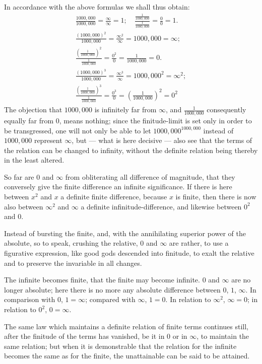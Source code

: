 \documentclass[12pt]{book}
\begin{document}
In accordance with the above formulas we shall thus obtain:
\begin{gather*}
\frac{1000{,}000}{1000{,}000} = \frac{\infty}{\infty} = 1; \quad
\frac{\frac{1}{1000{,}000}}{\frac{1}{1000{,}000}} = \frac{0}{0} = 1.\\
\frac{(1000{,}000)^{2}}{1000{,}000} = \frac{\infty^{2}}{\infty}
= 1000{,}000 = \infty;\\
\frac{\left(\frac{1}{1000{,}000}\right)^{2}}{\frac{1}{1000{,}000}}
= \frac{0^{2}}{0} = \frac{1}{1000{,}000} = 0.\\
\frac{(1000{,}000)^{3}}{1000{,}000} = \frac{\infty^{3}}{\infty}
= 1000{,}000^{2} = \infty^{2};\\
\frac{\left(\frac{1}{1000{,}000}\right)^{3}}{\frac{1}{1000{,}000}}
= \frac{0^{3}}{0} = \left(\frac{1}{1000{,}000}\right)^{2} = 0^{2}
\end{gather*}
The objection that $1000{,}000$ is infinitely far from $\infty$, and
$\frac{1}{1000{,}000}$ consequently equally far from $0$, means nothing; since the
finitude-limit is set only in order to be transgressed, one will not only be able to
let $1000{,}000^{1000{,}000}$ instead of $1000{,}000$ represent $\infty$,
but --- what is here decisive --- also see that the terms of the relation can be
changed to infinity, without the definite relation being thereby in the least
altered.

So far are $0$ and $\infty$ from obliterating all difference of magnitude, that they
conversely give the finite difference an infinite significance. If there is here
between $x^{2}$ and $x$ a definite finite difference, because $x$ is finite, then
there is now also between
$\infty^{2}$ and $\infty$ a definite infinitude-difference, and likewise between
$0^{2}$ and $0$.

Instead of bursting the finite, and, with the annihilating superior power of the
absolute, so to speak, crushing the relative, $0$ and $\infty$ are rather, to use a
figurative expression, like good gods descended into finitude, to exalt the relative
and to preserve the invariable in all changes.

The infinite becomes finite, that the finite may become infinite. $0$ and $\infty$
are no longer absolute; here there is no more any absolute difference between $0$,
$1$, $\infty$. In comparison with $0$, $1 = \infty$; compared with $\infty$,
$1 = 0$. In relation to $\infty^{2}$, $\infty = 0$; in relation to $0^{2}$,
$0 = \infty$.

The same law which maintains a definite relation of finite terms continues still,
after the finitude of the terms has vanished, be it in $0$ or in $\infty$, to
maintain the same relation; but when it is demonstrable that the relation for the
infinite becomes the same as for the finite, the unattainable can be said to be
attained.
\end{document}
